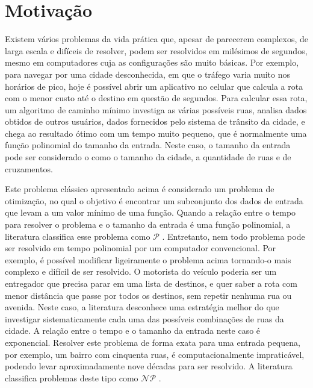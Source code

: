 \section{Motivação}

Existem vários problemas da vida prática que, apesar de parecerem complexos, de larga escala e difíceis de resolver, podem ser resolvidos em milésimos de segundos, mesmo em computadores cuja as configurações são muito básicas. Por exemplo, para navegar por uma cidade desconhecida, em que o tráfego varia muito nos horários de pico, hoje é possível abrir um aplicativo no celular que calcula a rota com o menor custo até o destino em questão de segundos. Para calcular essa rota, um algoritmo de caminho mínimo \cite{xu2007} investiga as várias possíveis ruas, analisa dados obtidos de outros usuários, dados fornecidos pelo sistema de trânsito da cidade, e chega ao resultado ótimo com um tempo muito pequeno, que é normalmente uma função polinomial do tamanho da entrada. Neste caso, o tamanho da entrada pode ser considerado o como o tamanho da cidade, a quantidade de ruas e de cruzamentos. 

Este problema clássico apresentado acima é considerado um problema de otimização, no qual o objetivo é encontrar um subconjunto dos dados de entrada que levam a um valor mínimo de uma função. Quando a relação entre o tempo para resolver o problema e o tamanho da entrada é uma função polinomial, a literatura classifica esse problema como $\mathcal{P}$ \cite{karp1972}. Entretanto, nem todo problema pode ser resolvido em tempo polinomial por um computador convencional. Por exemplo, é possível modificar ligeiramente o problema acima tornando-o mais complexo e difícil de ser resolvido. O motorista do veículo poderia ser um entregador que precisa parar em uma lista de destinos, e quer saber a rota com menor distância que passe por todos os destinos, sem repetir nenhuma rua ou avenida. Neste caso, a literatura desconhece uma estratégia melhor do que investigar sistematicamente cada uma das possíveis combinações de ruas da cidade. A relação entre o tempo e o tamanho da entrada neste caso é exponencial. Resolver este problema de forma exata para uma entrada pequena, por exemplo, um bairro com cinquenta ruas, é computacionalmente impraticável, podendo levar aproximadamente nove décadas para ser resolvido. A literatura classifica problemas deste tipo como $\mathcal{NP}$ \cite{li2015}.

